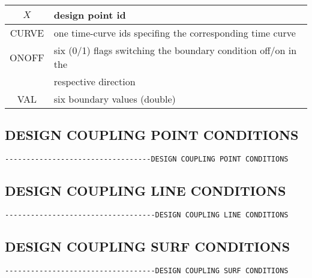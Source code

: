 \begin{center}
\begin{tabular}{c||l}
$X$                           & design point id                                                  \\ \hline
CURVE                         & one time-curve ids specifing the corresponding time curve        \\ \hline
ONOFF                         & six (0/1) flags switching the boundary condition off/on in the   \\
                              & respective direction                                             \\ \hline
VAL                           & six boundary values (double)                                     \\ \hline
\end{tabular}
\end{center}

\subsection{DESIGN COUPLING POINT CONDITIONS}
\begin{verbatim}
----------------------------------DESIGN COUPLING POINT CONDITIONS
\end{verbatim}



\subsection{DESIGN COUPLING LINE CONDITIONS}
\begin{verbatim}
-----------------------------------DESIGN COUPLING LINE CONDITIONS
\end{verbatim}



\subsection{DESIGN COUPLING SURF CONDITIONS}
\begin{verbatim}
-----------------------------------DESIGN COUPLING SURF CONDITIONS
\end{verbatim}


